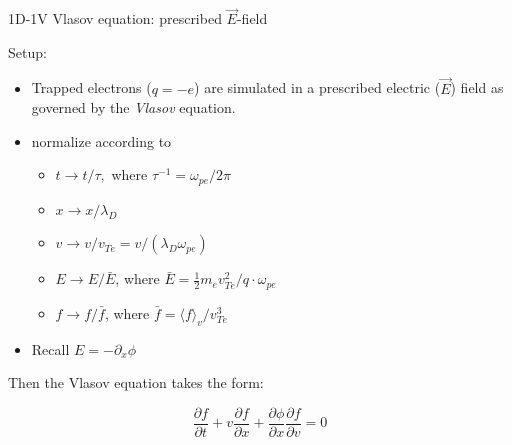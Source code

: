 \documentclass{beamer}
\begin{document}

\begin{frame}{1D-1V Vlasov equation: prescribed $\vec{E}$-field}

Setup:
\begin{itemize}
\item Trapped electrons ($q = -e$) are simulated in a prescribed electric ($\vec{E}$) field as governed by the \emph{Vlasov} equation.
\item normalize according to
    \begin{itemize}
    \item $t \rightarrow t / \tau,$ where $\tau^{-1} = \omega_{pe} / 2\pi$\\[0.5em]
    \item $x \rightarrow x / \lambda_D$\\[0.5em]
    \item $v \rightarrow v / v_{Te} = v / (\lambda_D\omega_{pe})$\\[0.5em]
    \item $E \rightarrow E / \bar{E}$, where $\bar{E} = \tfrac{1}{2}m_ev_{Te}^2 / q \cdot \omega_{pe}$  \\[0.5em]
    \item $f \rightarrow f / \bar{f}$, where $\bar{f} = \langle f \rangle_{v} / v_{Te}^3$
    \end{itemize}

\item Recall $E = -\partial_x \phi$
\end{itemize}

Then the Vlasov equation takes the form:

$$\frac{\partial f}{\partial t} + v\frac{\partial f}{\partial x} + \frac{\partial\phi}{\partial x}\frac{\partial f}{\partial v} = 0$$

\end{frame}

\end{document}
